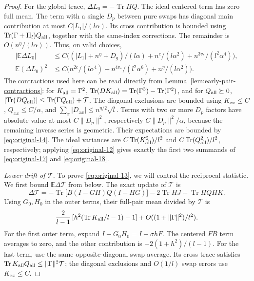 \begin{proof}
For the global trace, \(\Delta L_0=-\operatorname{Tr}H Q\).
The ideal centered term has zero full mean. The term with a single
\(D_p\) between pure swaps has diagonal main contribution at most
\(C|L_1|/(l\alpha)\). Its cross contribution is bounded using
\(\operatorname{Tr}(\Gamma+\Pi_l)Q_{\rm all}\), together with the
same-index corrections. The remainder is \(O(n^\eta/(l\alpha))\).
Thus, on valid choices,
\begin{equation}
\begin{split}
 |\mathbb E\Delta L_0|&\le C\big((|L_1|+n^\eta+D_g)/(l\alpha)
       +n^c/(l\alpha^2)+n^{3v_*}/(l^2\alpha^4)\big),\\
 \mathbb E(\Delta L_0)^2&\le C\big(n^{2c}/(l\alpha^4)+n^{4v_*}/(l^2\alpha^6)
                               +n^\eta/(l\alpha^2)\big).
\end{split}
\label{eq:original-18}
\end{equation}
The contractions used here can be read directly from
Lemma~\ref{lem:early-pair-contractions}: for \(K_{\rm all}=\Gamma^2\),
\(\operatorname{Tr}(DK_{\rm all})=
\operatorname{Tr}(\Gamma^3)-\operatorname{Tr}(\Gamma^2)\), and for
\(Q_{\rm all}\succeq0\),
\(\lvert\operatorname{Tr}(DQ_{\rm all})\rvert
\le\operatorname{Tr}(\Gamma Q_{\rm all})+\mathcal T\).
The diagonal exclusions are bounded using
\(K_{xx}\le C\), \(Q_{xx}\le C/\alpha\), and
\(\sum_x|D_{xx}|\le n^{\eta/2}\sqrt l\).
Terms with two or more \(D_p\) factors have absolute value at most
\(C\|D_p\|^2\), respectively \(C\|D_p\|^2/\alpha\), because
the remaining inverse series is geometric. Their expectations are
bounded by \eqref{eq:original-14}. The ideal variances are
\(C\operatorname{Tr}(K_{\rm all}^2)/l^2\) and
\(C\operatorname{Tr}(Q_{\rm all}^2)/l^2\), respectively; applying
\eqref{eq:original-12} gives exactly the first two summands of
\eqref{eq:original-17} and \eqref{eq:original-18}.

\emph{Lower drift of \(\mathcal T\).}
To prove \eqref{eq:original-13}, we will control the reciprocal statistic.
We first bound \(\mathbb E\Delta\mathcal T\) from below.
The exact update of $\mathcal T$ is
\begin{equation}
 \Delta\mathcal T=
 -\operatorname{Tr}\big[B(I-GH)Q(I-HG)\big]-2\operatorname{Tr}H J
       +\operatorname{Tr}H Q H K .
\label{eq:original-19}
\end{equation}
Using \(G_0,H_0\) in the outer terms, their full-pair mean divided by \(\mathcal T\) is
\[
 \frac{2}{l-1}\,[h^2(\operatorname{Tr}K_{\rm all}/l-1)-1]
       + O((1+\|\Gamma\|^2)/l^2).
\]
For the first outer term, expand \(I-G_0H_0=I+\sigma h F\).
The centered \(F B\) term averages to zero, and the other contribution is
\(-2(1+h^2)/(l-1)\). For the last term, use the same opposite-diagonal
swap average. Its cross trace satisfies
\(\operatorname{Tr}K_{\rm all} Q_{\rm all}\le\|\Gamma\|^2\mathcal T\);
the diagonal exclusions and \(O(1/l)\) swap errors use \(K_{xx}\le C\).


\end{proof}
